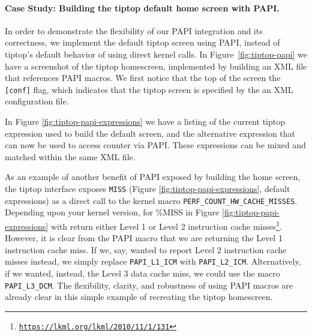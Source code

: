 \paragraph{Case Study: Building the tiptop default home screen with PAPI.}
In order to demonstrate the flexibility of our PAPI integration and its correctness, we implement the default tiptop screen using PAPI, instead of tiptop's default behavior of using direct kernel calls.
In Figure~\ref{fig:tiptop-papi} we have a screenshot of the tiptop homescreen, implemented by building an XML file that references PAPI macros.
We first notice that the top of the screen the \texttt{[conf]} flag, which indicates that the tiptop screen is specified by the an XML configuration file.

In Figure \ref{fig:tiptop-papi-expressions} we have a listing of the current tiptop expression used to build the default screen, and the alternative expression that can now be used to access counter via PAPI. These expressions can be mixed and matched within the same XML file.

As an example of another benefit of PAPI exposed by building the home screen, the tiptop interface exposes \texttt{MISS} (Figure \ref{fig:tiptop-papi-expressions}, default expressions) as a direct call to the kernel macro \texttt{PERF\_COUNT\_HW\_CACHE\_MISSES}.
Depending upon your kernel version, for \%MISS in Figure \ref{fig:tiptop-papi-expressions} with return either Level 1 or Level 2 instruction cache misses\footnote{\texttt{\url{https://lkml.org/lkml/2010/11/1/131}}}. However, it is clear from the PAPI macro that we are returning the Level 1 instruction cache miss. If we, say, wanted to report Level 2 instruction cache misses instead, we simply replace \texttt{PAPI\_L1\_ICM} with \texttt{PAPI\_L2\_ICM}.
Alternatively, if we wanted, instead, the Level 3 data cache miss, we could use the macro \texttt{PAPI\_L3\_DCM}.
The flexibility, clarity, and robustness of using PAPI macros are already clear in this simple example of recreating the tiptop homescreen.


